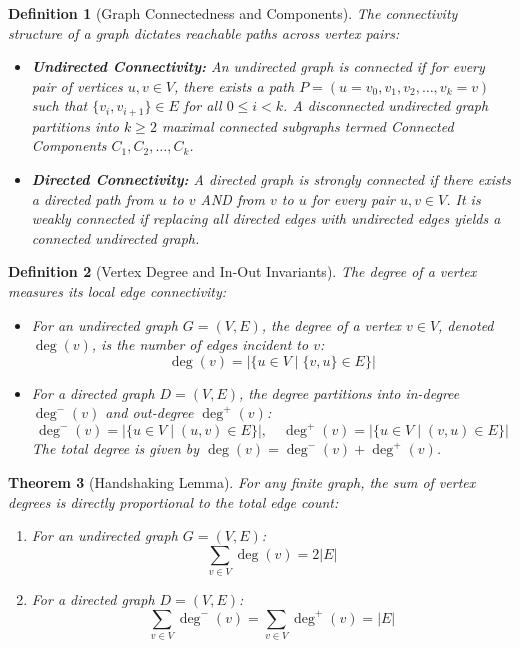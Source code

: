 \documentclass[10pt,journal,compsoc,onecolumn]{IEEEtran}
\newtheorem{theorem}{Theorem}
\newtheorem{definition}[theorem]{Definition}
\begin{document}
\begin{definition}[Graph Connectedness and Components]
The connectivity structure of a graph dictates reachable paths across vertex pairs:
\begin{itemize}
    \item \textbf{Undirected Connectivity:} An undirected graph is \emph{connected} if for every pair of vertices $u, v \in V$, there exists a path $P = (u = v_0, v_1, v_2, \dots, v_k = v)$ such that $\{v_i, v_{i+1}\} \in E$ for all $0 \le i < k$. A disconnected undirected graph partitions into $k \ge 2$ maximal connected subgraphs termed \emph{Connected Components} $C_1, C_2, \dots, C_k$.
    \item \textbf{Directed Connectivity:} A directed graph is \emph{strongly connected} if there exists a directed path from $u$ to $v$ AND from $v$ to $u$ for every pair $u, v \in V$. It is \emph{weakly connected} if replacing all directed edges with undirected edges yields a connected undirected graph.
\end{itemize}
\end{definition}

\begin{definition}[Vertex Degree and In-Out Invariants]
The degree of a vertex measures its local edge connectivity:
\begin{itemize}
    \item For an undirected graph $G=(V, E)$, the degree of a vertex $v \in V$, denoted $\deg(v)$, is the number of edges incident to $v$:
    \begin{equation}
    \deg(v) = |\{ u \in V \mid \{v, u\} \in E \}|
    \end{equation}
    \item For a directed graph $D=(V, E)$, the degree partitions into \emph{in-degree} $\deg^-(v)$ and \emph{out-degree} $\deg^+(v)$:
    \begin{equation}
    \deg^-(v) = |\{ u \in V \mid (u, v) \in E \}|, \quad \deg^+(v) = |\{ u \in V \mid (v, u) \in E \}|
    \end{equation}
    The total degree is given by $\deg(v) = \deg^-(v) + \deg^+(v)$.
\end{itemize}
\end{definition}

\begin{theorem}[Handshaking Lemma]
\label{thm:handshaking}
For any finite graph, the sum of vertex degrees is directly proportional to the total edge count:
\begin{enumerate}
    \item For an undirected graph $G = (V, E)$:
    \begin{equation}
    \sum_{v \in V} \deg(v) = 2|E|
    \end{equation}
    \item For a directed graph $D = (V, E)$:
    \begin{equation}
    \sum_{v \in V} \deg^-(v) = \sum_{v \in V} \deg^+(v) = |E|
    \end{equation}
\end{enumerate}
\end{theorem}
\end{document}
